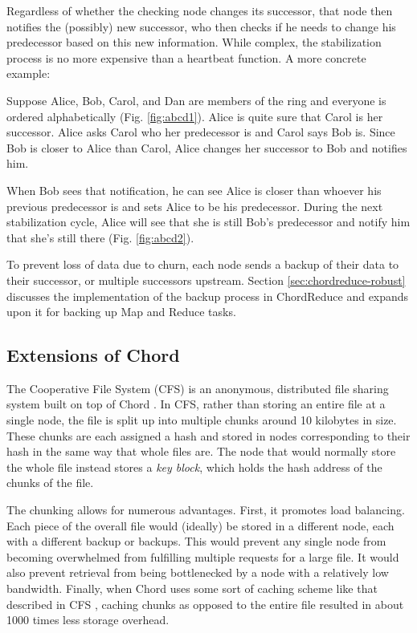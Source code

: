 Regardless of whether the checking node changes its successor, that node then notifies the (possibly) new successor,  who then checks if he needs to change his predecessor based on this new information.  
While complex, the stabilization process is no more expensive than a heartbeat function.  A more concrete example:

Suppose Alice, Bob, Carol, and Dan are members of the ring and everyone is ordered alphabetically (Fig. \ref{fig:abcd1}). 
Alice is quite sure that Carol is her successor.  
Alice asks Carol who her predecessor is and Carol says Bob is.  
Since Bob is closer to Alice than Carol, Alice changes her successor to Bob and notifies him.  

When Bob sees that notification, he can see Alice is closer than whoever his previous predecessor is and sets Alice to be his predecessor.  
During the next stabilization cycle, Alice will see that she is still Bob's predecessor and notify him that she's still there (Fig. \ref{fig:abcd2}).

To prevent loss of data due to churn, each node sends a backup of their data to their successor, or multiple successors upstream.  
Section \ref{sec:chordreduce-robust} discusses the implementation of the backup process in ChordReduce and expands upon it for backing up Map and Reduce tasks.


\subsection{Extensions of Chord}

The Cooperative File System (CFS) is an anonymous, distributed file sharing system built on top of Chord \cite{CFS}.  
In CFS, rather than storing an entire file at a single node, the file is split up into multiple chunks around 10 kilobytes in size.
These chunks are each assigned a hash and stored in nodes corresponding to their hash in the same way that whole files are.  
The node that would normally store the whole file instead stores a \emph{key block}, which holds the hash address of the chunks of the file. 

The chunking allows for numerous advantages.  
First, it promotes load balancing. 
Each piece of the overall file would (ideally) be stored in a different node, each with a different backup or backups.  
This would prevent any single node from becoming overwhelmed from fulfilling multiple requests for a large file.  
It would also prevent retrieval from being bottlenecked by a node with a relatively low bandwidth. 
Finally, when Chord uses some sort of caching scheme like that described in CFS \cite{CFS}, caching chunks as opposed to the entire file resulted in about 1000 times less storage overhead.  

